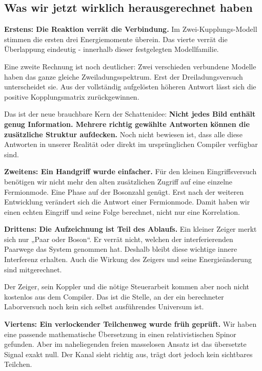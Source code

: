 \documentclass[
  ngerman,
  10pt,
  a4paper,
]{article}
\begin{document}
\subsection{Was wir jetzt wirklich herausgerechnet
haben}\label{was-wir-jetzt-wirklich-herausgerechnet-haben}

\textbf{Erstens: Die Reaktion verrät die Verbindung.} Im
Zwei-Kupplungs-Modell stimmen die ersten drei Energiemomente überein.
Das vierte verrät die Überlappung eindeutig - innerhalb dieser
festgelegten Modellfamilie.

Eine zweite Rechnung ist noch deutlicher: Zwei verschieden verbundene
Modelle haben das ganze gleiche Zweiladungsspektrum. Erst der
Dreiladungsversuch unterscheidet sie. Aus der vollständig aufgelösten
höheren Antwort lässt sich die positive Kopplungsmatrix zurückgewinnen.

Das ist der neue brauchbare Kern der Schattenidee: \textbf{Nicht jedes
Bild enthält genug Information. Mehrere richtig gewählte Antworten
können die zusätzliche Struktur aufdecken.} Noch nicht bewiesen ist,
dass alle diese Antworten in unserer Realität oder direkt im
ursprünglichen Compiler verfügbar sind.

\textbf{Zweitens: Ein Handgriff wurde einfacher.} Für den kleinen
Eingriffsversuch benötigen wir nicht mehr den alten zusätzlichen Zugriff
auf eine einzelne Fermionmode. Eine Phase auf der Bosonzahl genügt. Erst
nach der weiteren Entwicklung verändert sich die Antwort einer
Fermionmode. Damit haben wir einen echten Eingriff und seine Folge
berechnet, nicht nur eine Korrelation.

\textbf{Drittens: Die Aufzeichnung ist Teil des Ablaufs.} Ein kleiner
Zeiger merkt sich nur „Paar oder Boson``. Er verrät nicht, welchen der
interferierenden Paarwege das System genommen hat. Deshalb bleibt diese
wichtige innere Interferenz erhalten. Auch die Wirkung des Zeigers und
seine Energieänderung sind mitgerechnet.

Der Zeiger, sein Koppler und die nötige Steuerarbeit kommen aber noch
nicht kostenlos aus dem Compiler. Das ist die Stelle, an der ein
berechneter Laborversuch noch kein sich selbst ausführendes Universum
ist.

\textbf{Viertens: Ein verlockender Teilchenweg wurde früh geprüft.} Wir
haben eine passende mathematische Übersetzung in einen relativistischen
Spinor gefunden. Aber im naheliegenden freien masselosen Ansatz ist das
übersetzte Signal exakt null. Der Kanal sieht richtig aus, trägt dort
jedoch kein sichtbares Teilchen.
\end{document}
